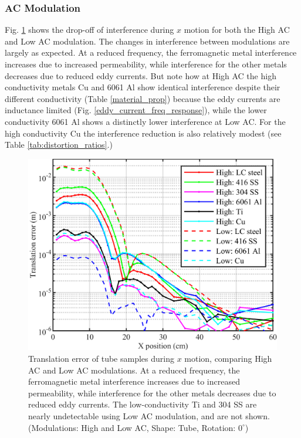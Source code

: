 \documentclass[journal,twoside,web]{ieeecolor}
\begin{document}
\subsubsection{AC Modulation}
Fig. \ref{frequency_tube} shows the drop-off of interference during $x$ motion for both the High AC and Low AC modulation. The changes in interference between modulations are largely as expected. At a reduced frequency, the ferromagnetic metal interference increases due to increased permeability, while interference for the other metals decreases due to reduced eddy currents. But note how at High AC the high conductivity metals Cu and 6061 Al show identical interference despite their different conductivity (Table \ref{material_prop}) because the eddy currents are inductance limited (Fig. \ref{eddy_current_freq_response}), while the lower conductivity 6061 Al shows a distinctly lower interference at Low AC. For the high conductivity Cu the interference reduction is also relatively modest (see Table \ref{tab:distortion_ratios}.)

\begin{figure}[H]
\centerline{\includegraphics[width=\columnwidth]{chaic9.png}}
\caption{Translation error of tube samples during $x$ motion, comparing High AC and Low AC modulations. At a reduced frequency, the ferromagnetic metal interference increases due to increased permeability, while interference for the other metals decreases due to reduced eddy currents. The low-conductivity Ti and 304 SS are nearly undetectable using Low AC modulation, and are not shown. 
(Modulations: High and Low AC, Shape: Tube, Rotation: $0^\circ$)}
\label{frequency_tube}
\end{figure}
\end{document}
